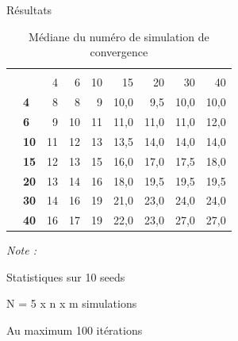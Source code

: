 \documentclass[10pt,xcolor=table,color={dvipsnames,usenames},ignorenonframetext,usepdftitle=false,french]{beamer}
\begin{document}
\begin{frame}{Résultats}
\protect\hypertarget{ruxe9sultats-1}{}

\begin{table}

\caption{\label{tab:tabq1convmed}Médiane du numéro de simulation de convergence}
\centering
\begin{threeparttable}
\begin{tabular}[t]{>{\bfseries}l|>{\bfseries}l|r|r|r|r|r|r|r}
\hline
\multicolumn{2}{c|}{ } & \multicolumn{7}{c}{m} \\
\cline{3-9}
  &    & 4 & 6 & 10 & 15 & 20 & 30 & 40\\
\hline
 & 4 & 8 & 8 & 9 & 10,0 & 9,5 & 10,0 & 10,0\\
\cline{2-9}
 & 6 & 9 & 10 & 11 & 11,0 & 11,0 & 11,0 & 12,0\\
\cline{2-9}
 & 10 & 11 & 12 & 13 & 13,5 & 14,0 & 14,0 & 14,0\\
\cline{2-9}
 & 15 & 12 & 13 & 15 & 16,0 & 17,0 & 17,5 & 18,0\\
\cline{2-9}
 & 20 & 13 & 14 & 16 & 18,0 & 19,5 & 19,5 & 19,5\\
\cline{2-9}
 & 30 & 14 & 16 & 19 & 21,0 & 23,0 & 24,0 & 24,0\\
\cline{2-9}
\multirow{-7}{*}{\raggedright\arraybackslash n} & 40 & 16 & 17 & 19 & 22,0 & 23,0 & 27,0 & 27,0\\
\hline
\end{tabular}
\begin{tablenotes}
\item \textit{Note : } 
\item Statistiques sur 10 seeds
\item N = 5 x n x m simulations
\item Au maximum 100 itérations
\end{tablenotes}
\end{threeparttable}
\end{table}

\end{frame}
\end{document}
